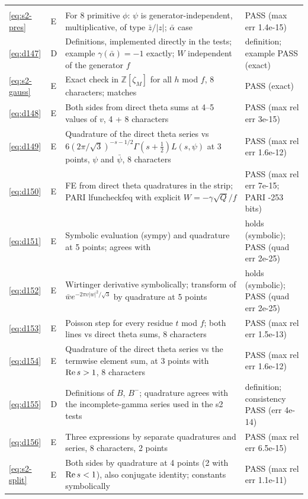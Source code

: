 \documentclass[11pt]{article}
\numberwithin{equation}{section}
\begin{document}
\begin{longtable}{@{}>{\raggedright\arraybackslash}p{1.2cm}>{\centering\arraybackslash}p{0.7cm}>{\raggedright\arraybackslash}p{9.05cm}>{\raggedright\arraybackslash}p{4.3cm}@{}}
\multicolumn{4}{@{}l}{\emph{Appendix~C}}\\
\eqref{eq:s2-pres} & E & For 8 primitive $\phi$: $\psi$ is generator-independent, multiplicative, of type $\bar z/|z|$; $\bar\alpha$ case & PASS (max err 1.4e-15)\\
\eqref{eq:d147} & D & Definitions, implemented directly in the tests; example $\gamma(\bar\alpha)=-1$ exactly; $W$ independent of the generator $f$ & definition; example PASS (exact)\\
\eqref{eq:s2-gauss} & E & Exact check in $\mathbb Z[\zeta_M]$ for all $h$ mod $f$, 8 characters; matches \cite[Lemma~17]{QF} & PASS (exact)\\
\eqref{eq:d148} & E & Both sides from direct theta sums at 4--5 values of $v$, 4 + 8 characters & PASS (max rel err 3e-15)\\
\eqref{eq:d149} & E & Quadrature of the direct theta series vs $6(2\pi/\sqrt3)^{-s-1/2}\Gamma(s+\frac12)L(s,\psi)$ at 3 points, $\psi$ and $\bar\psi$, 8 characters & PASS (max rel err 1.6e-12)\\
\eqref{eq:d150} & E & FE from direct theta quadratures in the strip; PARI lfuncheckfeq with explicit $W=-\gamma\sqrt Q/f$ & PASS (max rel err 7e-15; PARI -253 bits)\\
\eqref{eq:d151} & E & Symbolic evaluation (sympy) and quadrature at 5 points; agrees with \cite[Example~20]{QF} & holds (symbolic); PASS (quad err 2e-25)\\
\eqref{eq:d152} & E & Wirtinger derivative symbolically; transform of $\bar w e^{-2\pi v|w|^2/\sqrt3}$ by quadrature at 5 points & holds (symbolic); PASS (quad err 2e-25)\\
\eqref{eq:d153} & E & Poisson step for every residue $t$ mod $f$; both lines vs direct theta sums, 8 characters & PASS (max rel err 1.5e-13)\\
\eqref{eq:d154} & E & Quadrature of the direct theta series vs the termwise element sum, at 3 points with ${\rm Re}\,s>1$, 8 characters & PASS (max rel err 1.6e-12)\\
\eqref{eq:d155} & D & Definitions of $B$, $B^-$; quadrature agrees with the incomplete-gamma series used in the s2 tests & definition; consistency PASS (err 4e-14)\\
\eqref{eq:d156} & E & Three expressions by separate quadratures and series, 8 characters, 2 points & PASS (max rel err 6.5e-15)\\
\eqref{eq:s2-split} & E & Both sides by quadrature at 4 points (2 with ${\rm Re}\,s<1$), also conjugate identity; constants symbolically & PASS (max rel err 1.1e-11)\\

\end{longtable}
\end{document}
